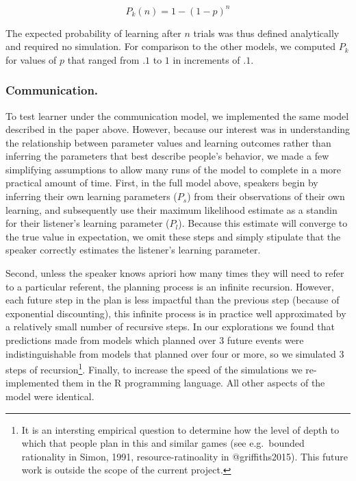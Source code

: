 \documentclass[english,,man,floatsintext]{apa6}
\begin{document}
\[ P_k(n) = 1 - \left(1-p\right)^{n}  \]

The expected probability of learning after \(n\) trials was thus defined analytically and required no simulation. For comparison to the other models, we computed \(P_{k}\) for values of \(p\) that ranged from \(.1\) to \(1\) in increments of \(.1\).

\hypertarget{communication.}{%
\subsubsection{Communication.}\label{communication.}}

To test learner under the communication model, we implemented the same model described in the paper above. However, because our interest was in understanding the relationship between parameter values and learning outcomes rather than inferring the parameters that best describe people's behavior, we made a few simplifying assumptions to allow many runs of the model to complete in a more practical amount of time. First, in the full model above, speakers begin by inferring their own learning parameters (\(P_{s}\)) from their observations of their own learning, and subsequently use their maximum likelihood estimate as a standin for their listener's learning parameter (\(P_{l}\)). Because this estimate will converge to the true value in expectation, we omit these steps and simply stipulate that the speaker correctly estimates the listener's learning parameter.

Second, unless the speaker knows apriori how many times they will need to refer to a particular referent, the planning process is an infinite recursion. However, each future step in the plan is less impactful than the previous step (because of exponential discounting), this infinite process is in practice well approximated by a relatively small number of recursive steps. In our explorations we found that predictions made from models which planned over 3 future events were indistinguishable from models that planned over four or more, so we simulated 3 steps of recursion\footnote{It is an intersting empirical question to determine how the level of depth to which that people plan in this and similar games (see e.g.~bounded rationality in Simon, 1991, resource-ratinoality in @griffiths2015). This future work is outside the scope of the current project.}. Finally, to increase the speed of the simulations we re-implemented them in the R programming language. All other aspects of the model were identical.
\end{document}
